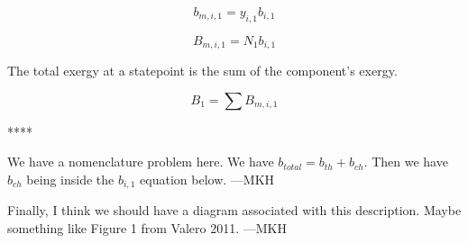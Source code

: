 \documentclass[energies,article,submit,pdftex,moreauthors]{Definitions/mdpi}
\begin{document}
\begin{equation}\label{eq:specific_exergy_of_current_statepoint_molar_based_definition}
  b_{m,i,1} = y_{i,1}b_{i,1}
\end{equation}

\begin{equation}\label{eq:specific_exergy_of_current_statepoint_mixture_definition}
  B_{m,i,1} = N_{1}b_{i,1}
\end{equation}

The total exergy at a statepoint
is the sum of the component's exergy.

\begin{equation}\label{eq:total_exergy_of_current_statepoint_mixture_definition}
  B_{1} = \sum{B_{m,i,1}}
\end{equation}



%
%
%
%


****

We have a nomenclature problem here.
We have $b_{total} = b_{th} + b_{ch}$.
Then we have
$b_{ch}$ being inside the $b_{i,1}$ equation below.
---MKH


Finally, I think we should have a diagram associated with this description.
Maybe something like Figure 1 from Valero 2011.
---MKH
\end{document}
